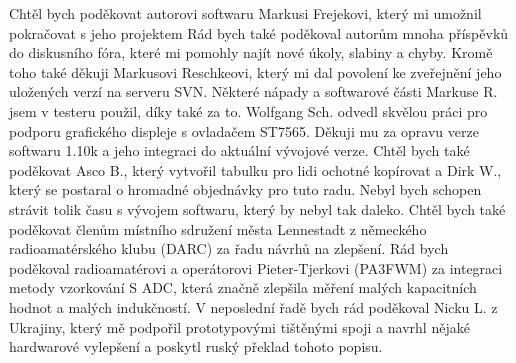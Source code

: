 Chtěl bych poděkovat autorovi softwaru Markusi Frejekovi, který mi umožnil pokračovat s jeho projektem
Rád bych také poděkoval autorům mnoha příspěvků do diskusního fóra, které mi pomohly najít nové úkoly,
slabiny a chyby.
Kromě toho také děkuji Markusovi Reschkeovi, který mi dal povolení ke zveřejnění jeho uložených verzí
na serveru SVN. Některé nápady a softwarové části Markuse R. jsem v testeru použil, díky také za to.
Wolfgang Sch. odvedl skvělou práci pro podporu grafického displeje s ovladačem ST7565.
Děkuji mu za opravu verze softwaru 1.10k a jeho integraci do aktuální vývojové verze.
Chtěl bych také poděkovat Asco B., který vytvořil tabulku pro lidi ochotné kopírovat a Dirk W.,
který se postaral o hromadné objednávky pro tuto radu.
Nebyl bych schopen strávit tolik času s vývojem softwaru, který by nebyl tak daleko.
Chtěl bych také poděkovat členům místního sdružení města Lennestadt z německého radioamatérského  klubu (DARC) za řadu návrhů na zlepšení.
Rád bych poděkoval radioamatérovi a operátorovi Pieter-Tjerkovi (PA3FWM) za integraci metody vzorkování S ADC, která značně zlepšila měření malých kapacitních hodnot a malých indukčností.
V neposlední řadě bych rád poděkoval Nicku L. z Ukrajiny, který mě podpořil prototypovými tištěnými spoji a navrhl nějaké hardwarové vylepšení a poskytl ruský překlad tohoto popisu.
